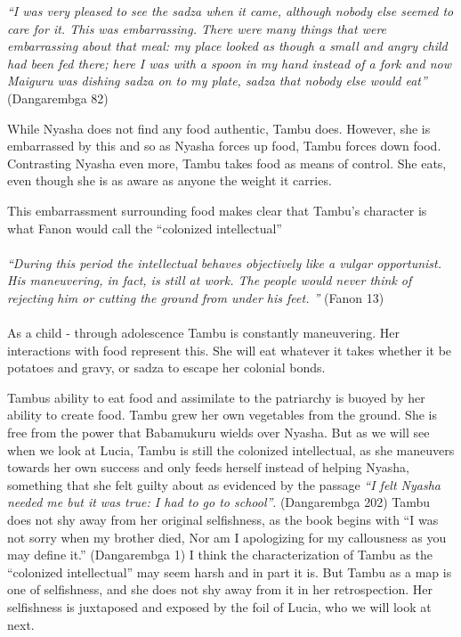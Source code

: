 \documentclass{article}
\begin{document}
\textit{``I was very pleased to see the sadza when it came, although nobody else seemed to care for it. This was embarrassing. There were many things that were embarrassing about that meal: my place looked as though a small and angry child had been fed there; here I was with a spoon in my hand instead of a fork and now Maiguru was dishing sadza on to my plate, sadza that nobody else would eat'' } (Dangarembga 82)


While Nyasha does not find any food authentic, Tambu does. However, she is embarrassed by this and so as Nyasha forces up food, Tambu forces down food. Contrasting Nyasha even more, Tambu takes food as means of control. She eats, even though she is as aware as anyone the weight it carries. 

This embarrassment surrounding food makes clear that Tambu's character is what Fanon would call the ``colonized intellectual'' 
\paragraph{}
\textit{``During this period the intellectual behaves objectively like a vulgar opportunist. His maneuvering, in fact, is still at work. The people would never think of rejecting him or cutting the ground from under his feet. ''} (Fanon 13)
\paragraph{}
As a child - through adolescence Tambu is constantly maneuvering. Her interactions with food represent this. She will eat whatever it takes whether it be potatoes and gravy, or sadza to escape her colonial bonds.

Tambus ability to eat food and assimilate to the patriarchy is buoyed by her ability to create food. Tambu grew her own vegetables from the ground. She is free from the power that Babamukuru wields over Nyasha. But as we will see when we look at Lucia, Tambu is still the colonized intellectual, as she maneuvers towards her own success and only feeds herself instead of helping Nyasha, something that she felt guilty about as evidenced by the passage \textit{``I felt Nyasha needed me but it was true: I had to go to school''}. (Dangarembga 202)  Tambu does not shy away from her original selfishness, as the book begins with  ``I was not sorry when my brother died, Nor am I apologizing for my callousness as you may define it.'' (Dangarembga 1) I think the characterization of Tambu as the ``colonized intellectual'' may seem harsh and in part it is. But Tambu as a map is one of selfishness, and she does not shy away from it in her retrospection. Her selfishness is juxtaposed and exposed by the foil of Lucia, who we will look at next.
\end{document}
